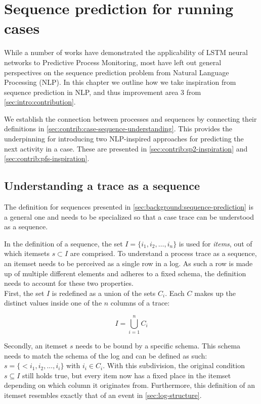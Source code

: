 \chapter{Sequence prediction for running cases}
\label{chap:taking-inspiration}
While a number of works have demonstrated the applicability of LSTM neural networks to Predictive Process Monitoring, most have left out general perspectives on the sequence prediction problem from Natural Language Processing (NLP). In this chapter we outline how we take inspiration from sequence prediction in NLP, and thus improvement area 3 from \autoref{sec:intro:contribution}.

We establish the connection between processes and sequences by connecting their definitions in \autoref{sec:contrib:case-sequence-understanding}. This provides the underpinning for introducing two NLP-inspired approaches for predicting the next activity in a case. These are presented in \autoref{sec:contrib:sp2-inspiration} and \autoref{sec:contrib:pfs-inspiration}.

\section{Understanding a trace as a sequence}\label{sec:contrib:case-sequence-understanding}
The definition for sequences presented in \autoref{sec:background:sequence-prediction} is a general one and needs to be specialized so that a case trace can be understood as a sequence.

In the definition of a sequence, the set $I=\{i_1, i_2, \dots, i_n\}$ is used for \textit{items}, out of which itemsets $s \subset I$ are comprised. To understand a process trace as a sequence, an itemset needs to be perceived as a single row in a log. As such a row is made up of multiple different elements and adheres to a fixed schema, the definition needs to account for these two properties.\\

\noindent First, the set $I$ is redefined as a union of the sets $C_i$. Each $C$ makes up the distinct values inside one of the $n$ columns of a trace:

$$I = \bigcup\limits_{i=1}^{n} C_{i}$$

Secondly, an itemset $s$ needs to be bound by a specific schema. This schema needs to match the schema of the log and can be defined as such: $s =\{<i_1, i_2, ..., i_i\}$ with $i_i \in C_i$. With this subdivision, the original condition $s \subseteq I$ still holds true, but every item now has a fixed place in the itemset depending on which column it originates from. Furthermore, this definition of an itemset resembles exactly that of an event in \autoref{sec:log-structure}.

